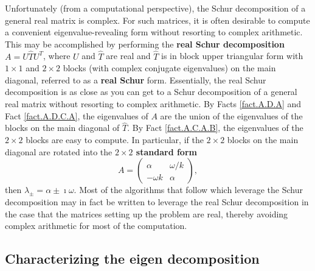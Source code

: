 Unfortunately (from a computational perspective), the Schur decomposition of a general real matrix is complex.
For such matrices, it is often desirable to compute a convenient eigenvalue-revealing form without resorting to
complex arithmetic.  This may be accomplished by performing the {\bf real Schur decomposition} $A=U \hat T U^T$, 
where $U$ and $\hat T$ are real and $\hat T$ is in block upper triangular form with $1\times 1$ and $2\times 2$
blocks (with complex conjugate eigenvalues) on the main diagonal, referred to as a {\bf real Schur} form.  
Essentially, the real Schur decomposition is as close as you can get to a Schur decomposition of a
general real matrix without resorting to complex arithmetic.
By Facts \ref{fact.A.D.A} and Fact \ref{fact.A.D.C.A}, the eigenvalues of $A$ are the
union of the eigenvalues of the blocks on the main diagonal of $\hat T$.  By Fact \ref{fact.A.C.A.B}, the eigenvalues of
the $2\times 2$ blocks are easy to compute.
In particular, if the $2\times 2$ blocks on the main diagonal are rotated into the {\bf $2\times 2$ standard form}
\begin{equation}
A=\begin{pmatrix} \alpha & \omega/k \\ -\omega k & \alpha \end{pmatrix},
\label{2by2standardform}
\end{equation}
then $\lambda_{\pm}=\alpha\pm \imath \omega$.  Most of the algorithms that follow which leverage the Schur decomposition may
in fact be written to leverage the real Schur decomposition in the case that the matrices setting up the problem are real, thereby
avoiding complex arithmetic for most of the computation.

\subsection{Characterizing the eigen decomposition}\label{sec.A.D.D}

